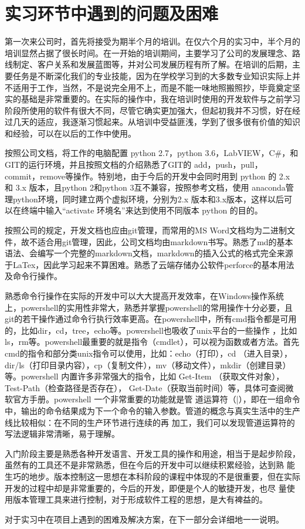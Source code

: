 \documentclass[UTF8]{ctexart}
\begin{document}
\section{实习环节中遇到的问题及困难}
第一次来公司时，首先将接受为期半个月的培训。在仅六个月的实习中，半个月的培训显然占据了很长时间。在一开始的培训期间，主要学习了公司的发展理念、路线制定、客户关系和发展蓝图等，并对公司发展历程有所了解。在培训的后期，主要任务是不断深化我们的专业技能，因为在学校学习到的大多数专业知识实际上并不适用于工作，当然，不是说完全用不上，而是不能一味地照搬照抄，毕竟奠定坚实的基础是非常重要的。在实际的操作中，我在培训时使用的开发软件与之前学习阶段所使用的软件有很大不同，尽管它确实更加强大，但起初我并不习惯，好在经过几天的适应，我逐渐习惯起来。从培训中受益匪浅，学到了很多很有价值的知识和经验，可以在以后的工作中使用。
\par
按照公司文档，将工作的电脑配置 python 2.7，python 3.6，LabVIEW，C\#，和GIT的运行环境，并且按照文档的介绍熟悉了GIT的 add，push，pull，
commit，remove等操作。特别地，由于今后的开发中会同时用到 python 的 2.x 和 3.x 版本，且python 2和python 3互不兼容，按照参考文档，使用 
anaconda管理python环境，同时建立两个虚拟环境，分别为2.x 版本和3.x版本，这样以后可以在终端中输入“activate 环境名”来达到使用不同版本 python
的目的。
\par
按照公司的规定，开发文档也应由git管理，而常用的MS Word文档均为二进制文件，故不适合用git管理，因此，公司文档均由markdown书写。熟悉了md的基本
语法、会编写一个完整的markdown文档，markdown的插入公式的格式完全来源于LaTex，因此学习起来不算困难。熟悉了云端存储办公软件perforce的基本用法
及命令行操作。
\par
熟悉命令行操作在实际的开发中可以大大提高开发效率，在Windows操作系统上，powershell的实用性非常大，熟悉并掌握powershell的常用操作十分必要，且
git的若干操作通过命令行执行效率更高。在powershell中，所有cmd指令都是可用的，比如dir，cd，tree，echo等。powershell也吸收了unix平台的一些操作
，比如ls，rm等。powershell最重要的就是指令（cmdlet），可以视为函数或者方法。首先cmd的指令和部分类unix指令可以使用，比如：echo（打印），cd
（进入目录），dir/ls（打印目录内容），cp（复制文件），mv（移动文件），mkdir（创建目录）等。powershell 内置许多非常强大的指令，比如 Get-Item
（获取文件对象）， Test-Path（检查路径是否存在）， Get-Date（获取当前时间）等，具体可查阅微软官方手册。powershell 一个非常重要的功能就是管
道运算符（|），即在一组命令中，输出的命令结果成为下一个命令的输入参数。管道的概念与真实生活中的生产线比较相似：在不同的生产环节进行连续的再
加工，我们可以发现管道运算符的写法逻辑非常清晰，易于理解。
\par
入门阶段主要是熟悉各种开发语言、开发工具的操作和用途，相当于是起步阶段，虽然有的工具还不是非常熟悉，但在今后的开发中可以继续积累经验，达到熟
能生巧的地步。版本控制这一思想在本科阶段的课程中体现的不是很重要，但在实际开发的过程中却是非常重要的，今后的开发，即便是个人的敏捷开发，也尽
量使用版本管理工具来进行控制，对于形成软件工程的思想，是大有裨益的。
\par
对于实习中在项目上遇到的困难及解决方案，在下一部分会详细地一一说明。
\end{document}
